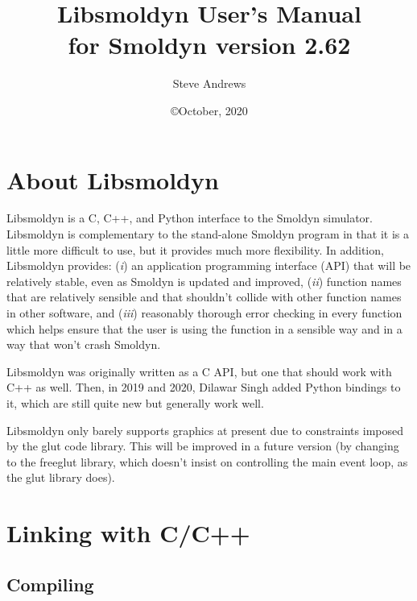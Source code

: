 \documentclass {book}
\begin{document}



\title{\textbf{Libsmoldyn User's Manual} \\ \large for Smoldyn version 2.62}
\date{\copyright October, 2020}
\author{Steve Andrews}
\maketitle

\tableofcontents


\chapter{About Libsmoldyn}
Libsmoldyn is a C, C++, and Python interface to the Smoldyn simulator. Libsmoldyn is complementary to the stand-alone Smoldyn program in that it is a little more difficult to use, but it provides much more flexibility. In addition, Libsmoldyn provides: (\emph{i}) an application programming interface (API) that will be relatively stable, even as Smoldyn is updated and improved, (\emph{ii}) function names that are relatively sensible and that shouldn't collide with other function names in other software, and (\emph{iii}) reasonably thorough error checking in every function which helps ensure that the user is using the function in a sensible way and in a way that won't crash Smoldyn.

Libsmoldyn was originally written as a C API, but one that should work with C++ as well. Then, in 2019 and 2020, Dilawar Singh added Python bindings to it, which are still quite new but generally work well.

Libsmoldyn only barely supports graphics at present due to constraints imposed by the glut code library. This will be improved in a future version (by changing to the freeglut library, which doesn't insist on controlling the main event loop, as the glut library does).


\chapter{Linking with C/C++}

\section{Compiling}
\end{document}
